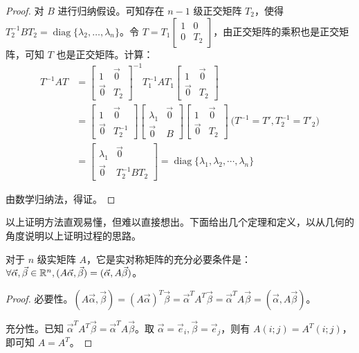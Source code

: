 \begin{proof}
	对 $B$ 进行归纳假设。可知存在 $n - 1$ 级正交矩阵 $T_2$，使得 $T_2^{-1} B T_2 = \operatorname{diag} \{\lambda_2, \ldots, \lambda_n\}$。令 $T = T_1 \begin{bmatrix} 1 & 0 \\ 0 & T_2 \end{bmatrix}$，由正交矩阵的乘积也是正交矩阵，可知 $T$ 也是正交矩阵。计算：
	$$
	\begin{aligned}
	T^{-1} AT &= \begin{bmatrix} 1 & \vec 0 \\ \vec 0 & T_2 \end{bmatrix}^{-1} T_1^{-1} A T_1 \begin{bmatrix} 1 & \vec 0 \\ \vec 0 & T_2 \end{bmatrix}
	\\&=
	\begin{bmatrix} 1 & \vec 0 \\ \vec 0 & T_2^{-1} \end{bmatrix}
	\begin{bmatrix} \lambda_1 & \vec 0 \\ \vec 0 & B \end{bmatrix}
	\begin{bmatrix} 1 & \vec 0 \\ \vec 0 & T_2 \end{bmatrix} \pod{T^{-1} = T', T_2^{-1} = T'_2}
	\\&=
	\begin{bmatrix} \lambda_1 & \vec 0 \\ \vec 0 & T_2^{-1} B T_2 \end{bmatrix}
	= \operatorname{diag}\{\lambda_1, \lambda_2, \cdots, \lambda_n\}
	\end{aligned}
	$$

	由数学归纳法，得证。
\end{proof}

以上证明方法直观易懂，但难以直接想出。下面给出几个定理和定义，以从几何的角度说明以上证明过程的思路。

\begin{theorem}
	对于 $n$ 级实矩阵 $A$，它是实对称矩阵的充分必要条件是：$\forall \vec \alpha, \vec \beta \in \mathbb R^n, (A \vec \alpha, \vec \beta) = (\vec \alpha, A \vec \beta)$。
\end{theorem}

\begin{proof}
	必要性。$(A \vec \alpha, \vec \beta) = (A \vec \alpha)^T \vec \beta = \vec \alpha^T A^T \vec \beta = \vec \alpha^T A \vec \beta = (\vec \alpha, A \vec \beta)$。

	充分性。已知 $\vec \alpha^T A^T \vec \beta = \vec \alpha^T A \vec \beta$。取 $\vec \alpha = \vec e_i, \vec \beta = \vec e_j$，则有 $A(i; j) = A^T(i; j)$，即可知 $A = A^T$。
\end{proof}


